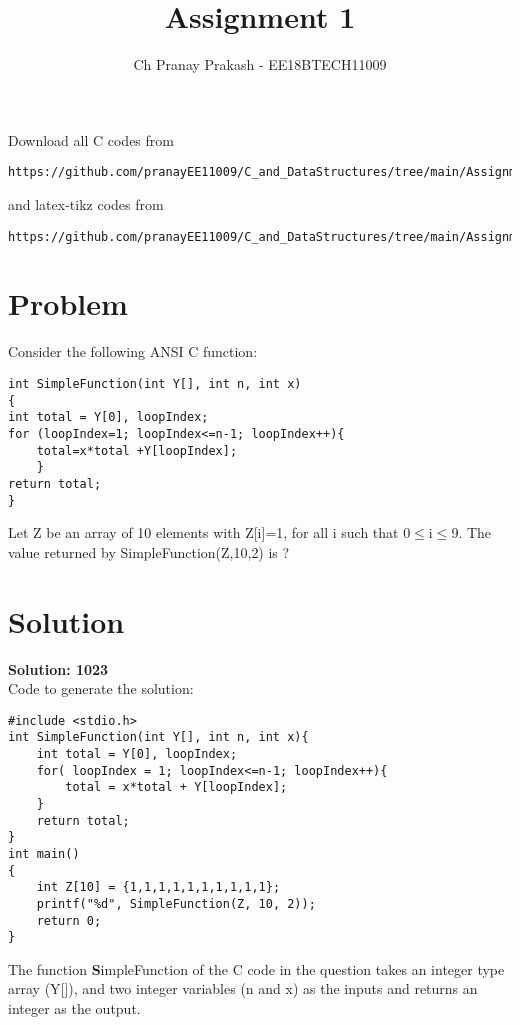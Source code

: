 \documentclass[journal,12pt,twocolumn]{IEEEtran}
\begin{document}
     \def\rightbox#1{\makebox[0in][r]{#1}}
     \def\centbox#1{\makebox[0in]{#1}}
     \def\topbox#1{\raisebox{-\baselineskip}[0in][0in]{#1}}
     \def\midbox#1{\raisebox{-0.5\baselineskip}[0in][0in]{#1}}
\vspace{3cm}
\title{Assignment 1}
\author{Ch Pranay Prakash - EE18BTECH11009}
\maketitle
\newpage
\bigskip
\renewcommand{\thefigure}{\theenumi}
\renewcommand{\thetable}{\theenumi}
Download all C codes from 
\begin{lstlisting}
https://github.com/pranayEE11009/C_and_DataStructures/tree/main/Assignment_1/codes
\end{lstlisting}
%
and latex-tikz codes from 
%
\begin{lstlisting}
https://github.com/pranayEE11009/C_and_DataStructures/tree/main/Assignment_1
\end{lstlisting}
\section{Problem}
Consider the following ANSI C function:
\begin{lstlisting}
int SimpleFunction(int Y[], int n, int x)
{
int total = Y[0], loopIndex;
for (loopIndex=1; loopIndex<=n-1; loopIndex++){
    total=x*total +Y[loopIndex];
    }
return total;
} 
\end{lstlisting}
Let Z be an array of 10 elements with Z[i]=1, for all i such that 0$\le$i$\le$9. The value returned by SimpleFunction(Z,10,2) is ?
\section{Solution}
{\textbf {Solution: 1023}}\\

Code to generate the solution:
\begin{lstlisting}
#include <stdio.h>
int SimpleFunction(int Y[], int n, int x){
    int total = Y[0], loopIndex;
    for( loopIndex = 1; loopIndex<=n-1; loopIndex++){
        total = x*total + Y[loopIndex];
    }
    return total;
}
int main()
{
    int Z[10] = {1,1,1,1,1,1,1,1,1,1};
    printf("%d", SimpleFunction(Z, 10, 2));
    return 0;
}
\end{lstlisting}

The function {\textbf SimpleFunction} of the C code in the question takes an integer type array (Y[]), and two integer variables (n and x) as the inputs and returns an integer as the output.\\
\end{document}
